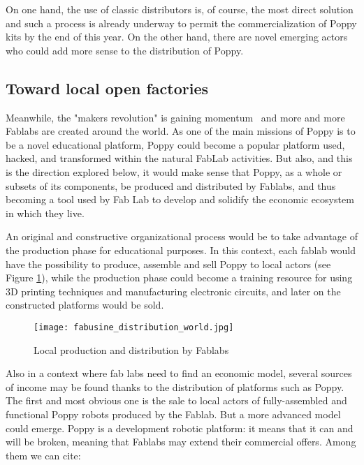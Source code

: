 On one hand, the use of classic distributors is, of course, the most direct solution and such a process is already underway to permit the commercialization of Poppy kits by the end of this year. On the other hand, there are novel emerging actors who could add more sense to the distribution of Poppy.


\subsection{Toward local open factories} %

Meanwhile, the "makers revolution" is gaining momentum~\parencite{anderson2012makers} and more and more Fablabs are created around the world. As one of the main missions of Poppy is to be a novel educational platform, Poppy could become a popular platform used, hacked, and transformed within the natural FabLab activities. But also, and this is the direction explored below,  it would make sense that Poppy, as a whole or subsets of its components, be produced and distributed by Fablabs, and thus becoming a tool used by Fab Lab to develop and solidify the economic ecosystem in which they live.

An original and constructive organizational process would be to take advantage of the production phase for educational purposes. In this context, each fablab would have the possibility to produce, assemble and sell Poppy to local actors (see Figure \ref{fig:world_fab}), while the production phase could become a training resource for using 3D printing techniques and manufacturing electronic circuits, and  later on the constructed platforms would be sold.

\begin{figure}[tb]
    \begin{center}
        \texttt{[image: fabusine\_distribution\_world.jpg]}
    \end{center}
    \caption{Local production and distribution by Fablabs}
    \label{fig:world_fab}
\end{figure}


Also in a context where fab labs need to find an economic model, several sources of income may be found thanks to the distribution of platforms such as Poppy. The first and most obvious one is the sale to local actors of fully-assembled and functional Poppy robots produced by the Fablab. But a more advanced model could emerge. Poppy is a development robotic platform: it means that it can and will be broken, meaning that Fablabs may extend their commercial offers. Among them we can cite:

